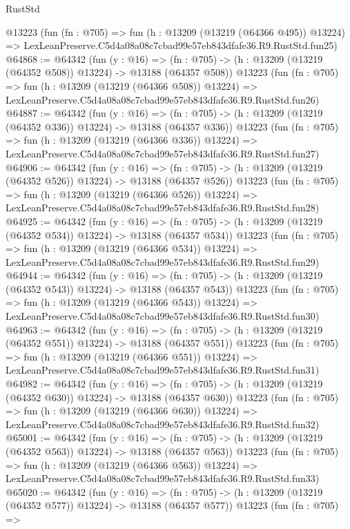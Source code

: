 \begin{lexlean}{RustStd}
\begin{coremodule}
    @13223
    (fun (fn : @705) =>
    fun (h : @13209 (@13219 (@64366 @495)) @13224) =>
    LexLeanPreserve.C5d4a08a08c7cbad99e57eb843dfafe36.R9.RustStd.fun25)
@64868 := @64342
    (fun (y : @16) =>
    (fn : @705) -> (h : @13209 (@13219 (@64352 @508)) @13224) -> @13188 (@64357 @508))
    @13223
    (fun (fn : @705) =>
    fun (h : @13209 (@13219 (@64366 @508)) @13224) =>
    LexLeanPreserve.C5d4a08a08c7cbad99e57eb843dfafe36.R9.RustStd.fun26)
@64887 := @64342
    (fun (y : @16) =>
    (fn : @705) -> (h : @13209 (@13219 (@64352 @336)) @13224) -> @13188 (@64357 @336))
    @13223
    (fun (fn : @705) =>
    fun (h : @13209 (@13219 (@64366 @336)) @13224) =>
    LexLeanPreserve.C5d4a08a08c7cbad99e57eb843dfafe36.R9.RustStd.fun27)
@64906 := @64342
    (fun (y : @16) =>
    (fn : @705) -> (h : @13209 (@13219 (@64352 @526)) @13224) -> @13188 (@64357 @526))
    @13223
    (fun (fn : @705) =>
    fun (h : @13209 (@13219 (@64366 @526)) @13224) =>
    LexLeanPreserve.C5d4a08a08c7cbad99e57eb843dfafe36.R9.RustStd.fun28)
@64925 := @64342
    (fun (y : @16) =>
    (fn : @705) -> (h : @13209 (@13219 (@64352 @534)) @13224) -> @13188 (@64357 @534))
    @13223
    (fun (fn : @705) =>
    fun (h : @13209 (@13219 (@64366 @534)) @13224) =>
    LexLeanPreserve.C5d4a08a08c7cbad99e57eb843dfafe36.R9.RustStd.fun29)
@64944 := @64342
    (fun (y : @16) =>
    (fn : @705) -> (h : @13209 (@13219 (@64352 @543)) @13224) -> @13188 (@64357 @543))
    @13223
    (fun (fn : @705) =>
    fun (h : @13209 (@13219 (@64366 @543)) @13224) =>
    LexLeanPreserve.C5d4a08a08c7cbad99e57eb843dfafe36.R9.RustStd.fun30)
@64963 := @64342
    (fun (y : @16) =>
    (fn : @705) -> (h : @13209 (@13219 (@64352 @551)) @13224) -> @13188 (@64357 @551))
    @13223
    (fun (fn : @705) =>
    fun (h : @13209 (@13219 (@64366 @551)) @13224) =>
    LexLeanPreserve.C5d4a08a08c7cbad99e57eb843dfafe36.R9.RustStd.fun31)
@64982 := @64342
    (fun (y : @16) =>
    (fn : @705) -> (h : @13209 (@13219 (@64352 @630)) @13224) -> @13188 (@64357 @630))
    @13223
    (fun (fn : @705) =>
    fun (h : @13209 (@13219 (@64366 @630)) @13224) =>
    LexLeanPreserve.C5d4a08a08c7cbad99e57eb843dfafe36.R9.RustStd.fun32)
@65001 := @64342
    (fun (y : @16) =>
    (fn : @705) -> (h : @13209 (@13219 (@64352 @563)) @13224) -> @13188 (@64357 @563))
    @13223
    (fun (fn : @705) =>
    fun (h : @13209 (@13219 (@64366 @563)) @13224) =>
    LexLeanPreserve.C5d4a08a08c7cbad99e57eb843dfafe36.R9.RustStd.fun33)
@65020 := @64342
    (fun (y : @16) =>
    (fn : @705) -> (h : @13209 (@13219 (@64352 @577)) @13224) -> @13188 (@64357 @577))
    @13223
    (fun (fn : @705) =>

\end{coremodule}
\end{lexlean}
